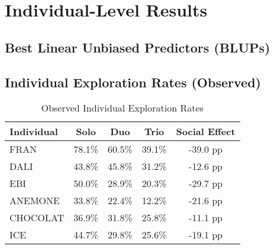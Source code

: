 \documentclass[11pt,a4paper]{article}
\begin{document}
\section{Individual-Level Results}

\subsection{Best Linear Unbiased Predictors (BLUPs)}

\begin{table}[H]
\centering
\caption{Individual Random Effects (BLUPs)}
\end{table}

\subsection{Individual Exploration Rates (Observed)}

\begin{table}[H]
\centering
\caption{Observed Individual Exploration Rates}
\begin{tabular}{lcccc}
\toprule
Individual & Solo & Duo & Trio & Social Effect \\
\midrule
FRAN & 78.1\% & 60.5\% & 39.1\% & -39.0 pp \\
DALI & 43.8\% & 45.8\% & 31.2\% & -12.6 pp \\
EBI & 50.0\% & 28.9\% & 20.3\% & -29.7 pp \\
ANEMONE & 33.8\% & 22.4\% & 12.2\% & -21.6 pp \\
CHOCOLAT & 36.9\% & 31.8\% & 25.8\% & -11.1 pp \\
ICE & 44.7\% & 29.8\% & 25.6\% & -19.1 pp \\
\bottomrule
\end{tabular}
\end{table}
\end{document}

